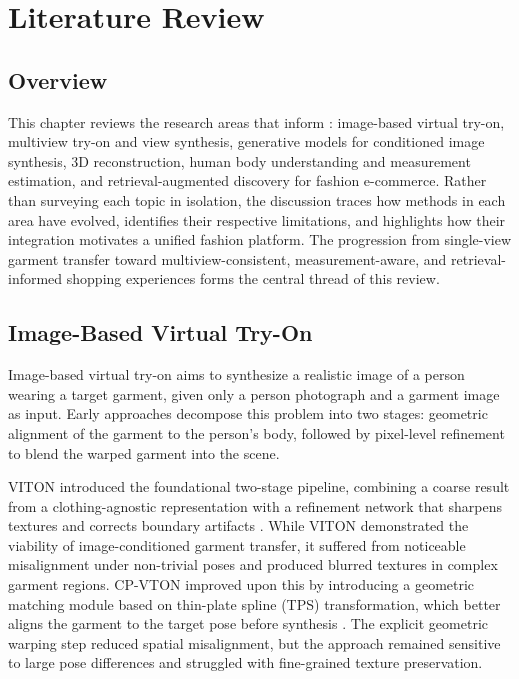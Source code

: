 \chapter{Literature Review}

\section{Overview}
This chapter reviews the research areas that inform \projectname: image-based virtual try-on, multiview try-on and view synthesis, generative models for conditioned image synthesis, 3D reconstruction, human body understanding and measurement estimation, and retrieval-augmented discovery for fashion e-commerce. Rather than surveying each topic in isolation, the discussion traces how methods in each area have evolved, identifies their respective limitations, and highlights how their integration motivates a unified fashion platform. The progression from single-view garment transfer toward multiview-consistent, measurement-aware, and retrieval-informed shopping experiences forms the central thread of this review.

\section{Image-Based Virtual Try-On}
Image-based virtual try-on aims to synthesize a realistic image of a person wearing a target garment, given only a person photograph and a garment image as input. Early approaches decompose this problem into two stages: geometric alignment of the garment to the person's body, followed by pixel-level refinement to blend the warped garment into the scene.

VITON introduced the foundational two-stage pipeline, combining a coarse result from a clothing-agnostic representation with a refinement network that sharpens textures and corrects boundary artifacts \cite{han2018viton}. While VITON demonstrated the viability of image-conditioned garment transfer, it suffered from noticeable misalignment under non-trivial poses and produced blurred textures in complex garment regions. CP-VTON improved upon this by introducing a geometric matching module based on thin-plate spline (TPS) transformation, which better aligns the garment to the target pose before synthesis \cite{wang2018cpvton}. The explicit geometric warping step reduced spatial misalignment, but the approach remained sensitive to large pose differences and struggled with fine-grained texture preservation.

